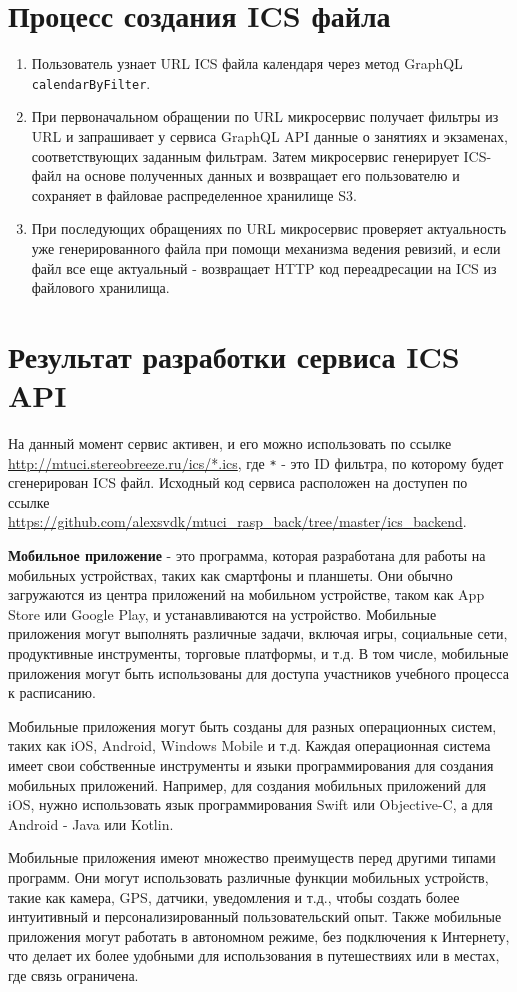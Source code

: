 \section{Процесс создания ICS файла}
\begin{enumerate}
\item Пользователь узнает URL ICS файла календаря через метод GraphQL \texttt{calendarByFilter}.
\item При первоначальном обращении по URL микросервис получает фильтры из URL и запрашивает у сервиса 
GraphQL API данные о занятиях и экзаменах, соответствующих заданным фильтрам. 
Затем микросервис генерирует ICS-файл на основе полученных данных и возвращает 
его пользователю и сохраняет в файловае распределенное хранилище S3.
\item При последующих обращениях по URL микросервис проверяет актуальность уже 
генерированного файла при помощи механизма ведения ревизий, и если файл все 
еще актуальный - возвращает HTTP код переадресации на ICS из файлового хранилища.
\end{enumerate}

\section{Результат разработки сервиса ICS API}
На данный момент сервис активен, и его можно использовать по ссылке \url{http://mtuci.stereobreeze.ru/ics/*.ics}, 
где \texttt{*} - это ID фильтра, по которому будет сгенерирован ICS файл.
Исходный код сервиса расположен на доступен по ссылке \url{https://github.com/alexsvdk/mtuci_rasp_back/tree/master/ics_backend}.


\textbf{Мобильное приложение} - это программа, которая разработана для работы на мобильных устройствах,
таких как смартфоны и планшеты. Они обычно загружаются из центра приложений на мобильном устройстве,
таком как App Store или Google Play, и устанавливаются на устройство.
Мобильные приложения могут выполнять различные задачи, включая игры, социальные сети,
продуктивные инструменты, торговые платформы, и т.д.
В том числе, мобильные приложения могут быть использованы для доступа участников учебного процесса к расписанию.

Мобильные приложения могут быть созданы для разных операционных систем, 
таких как iOS, Android, Windows Mobile и т.д.
Каждая операционная система имеет свои собственные инструменты и языки программирования для создания мобильных приложений.
Например, для создания мобильных приложений для iOS,
нужно использовать язык программирования Swift или Objective-C, а для Android - Java или Kotlin.

Мобильные приложения имеют множество преимуществ перед другими типами программ.
Они могут использовать различные функции мобильных устройств, такие как камера, GPS, датчики, уведомления и т.д.,
чтобы создать более интуитивный и персонализированный пользовательский опыт.
Также мобильные приложения могут работать в автономном режиме, без подключения к Интернету,
что делает их более удобными для использования в путешествиях или в местах, где связь ограничена.
